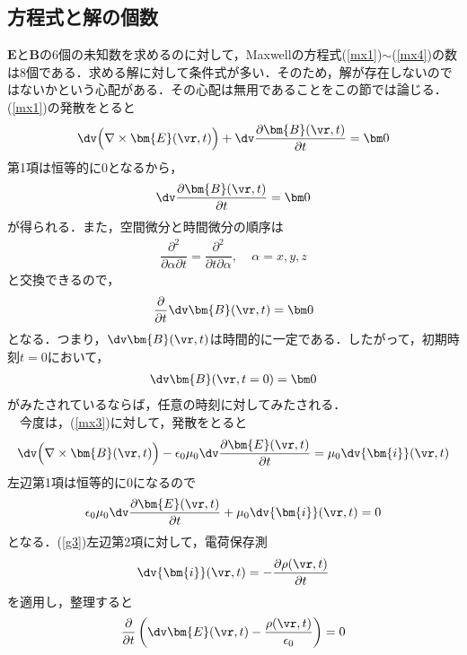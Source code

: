 \subsection{方程式と解の個数}
$\bm{E}$と$\bm{B}$の6個の未知数を求めるのに対して，Maxwellの方程式(\ref{mx1})$\sim$(\ref{mx4})の数は8個である．求める解に対して条件式が多い．そのため，解が存在しないのではないかという心配がある．その心配は無用であることをこの節では論じる．
(\ref{mx1})の発散をとると
\begin{align}
\dv\Bigl(\nabla\times\bm{E}(\vr,t)\Bigr)+\dv\dfrac{\partial\bm{B}(\vr,t)}{\partial t}=\bm 0
\end{align}
第1項は恒等的に$0$となるから，
\begin{align}
\dv\dfrac{\partial\bm{B}(\vr,t)}{\partial t}=\bm 0
\end{align}
が得られる．また，空間微分と時間微分の順序は
\begin{align}
\dfrac{\partial^2 }{\partial \alpha\partial t}=\dfrac{\partial^2 }{\partial t\partial \alpha},\ \ \ \ \ \alpha=x,y,z
\end{align}
と交換できるので，
\begin{align}\label{g1}
\dfrac{\partial}{\partial t}\dv\bm{B}(\vr,t)=\bm 0
\end{align}
となる．つまり，$\dv\bm{B}(\vr,t)$は時間的に一定である．したがって，初期時刻$t=0$において，
\begin{align}\label{g2}
\dv\bm{B}(\vr,t=0)=\bm 0
\end{align}
がみたされているならば，任意の時刻に対してみたされる．\\
%
%
　今度は，(\ref{mx3})に対して，発散をとると
\begin{align}
\dv\Bigl(\nabla\times\bm{B}(\vr,t)\Bigr)-\epsilon_0\mu_0\dv\dfrac{\partial\bm{E}(\vr,t)}{\partial t}
      =\mu_0\dv{\bm{i}}(\vr,t)
\end{align}
左辺第1項は恒等的に$0$になるので
\begin{align}
\label{g3}
\epsilon_0\mu_0\dv\dfrac{\partial\bm{E}(\vr,t)}{\partial t}+\mu_0\dv{\bm{i}}(\vr,t)=0
\end{align}
となる．(\ref{g3})左辺第2項に対して，電荷保存測
\begin{align}
\label{dc}
\dv{\bm{i}}(\vr,t)=-\dfrac{\partial\rho(\vr,t)}{\partial t}
\end{align}
を適用し，整理すると
\begin{align}
\label{g4}
\dfrac{\partial}{\partial t}\left(\dv\bm{E}(\vr,t)-\frac{\rho(\vr,t)}{\epsilon_0}\right)=0
\end{align}
